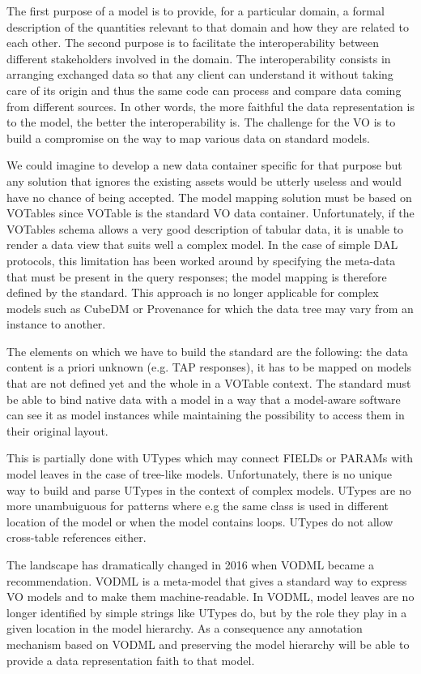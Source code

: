 
The first purpose of a model is to provide, for a particular domain, a formal description of the quantities relevant to that domain and how they are related to each other.
The second purpose is to facilitate the interoperability between  different stakeholders involved in the domain. The interoperability consists in arranging exchanged data 
so that any client can understand it without taking care of its origin and thus the same code can process and compare data coming from different sources.  
In other words, the more faithful the data representation is to the model, the better the interoperability is.
The challenge for the VO is to build a compromise on the way to map various data on standard models.

We could imagine to develop a new data container specific for that  purpose but any solution that ignores the existing assets would be utterly useless and would have no chance of being accepted.
The model mapping solution must be based on VOTables since VOTable  \citep{2019ivoa.spec.1021O} is the standard VO data container.
Unfortunately, if the VOTables schema allows a very good description of tabular data, it is unable to render a data view that suits well a complex model.
In the case of simple DAL protocols, this limitation has been worked around by specifying the meta-data that must be present in the query responses; the model mapping is therefore defined by the standard.
This approach is no longer applicable for complex models such as CubeDM or Provenance for which the data tree may vary from an instance to another.

The elements on which we have to build the standard are the following: the data content is a priori unknown (e.g. TAP responses), it has to be mapped on models that are not defined yet and the whole in a VOTable context.
The standard must be able to bind native data with a model in a way that a model-aware software can see it as 
model instances while maintaining the possibility to access them in their original layout.

This is partially done with UTypes which may connect FIELDs or PARAMs with model leaves in the case of tree-like models. 
Unfortunately, there is no unique  way to build and parse UTypes in the context of complex models. 
UTypes are no more unambuiguous for patterns where e.g the same class is used in different location of the model or when the model contains loops. 
UTypes do not allow cross-table references either. 

The landscape has dramatically changed in 2016 when VODML \citep{2018ivoa.spec.0910L} became a recommendation. 
VODML is a meta-model that gives a standard way to express VO models and to make them machine-readable.
In VODML, model leaves are no longer identified by simple strings like UTypes do, but by the role they play in a given location in the model hierarchy.
As a consequence any annotation mechanism based on VODML and preserving the model hierarchy will be able  to provide a data representation faith to that model.

